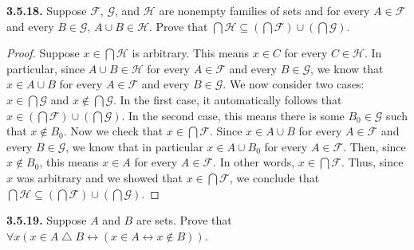 \documentclass[12pt]{amsart}
\newenvironment{statement}[1]{\smallskip\noindent\color[rgb]{.6627, .3529, .6314} {\bf #1.}}{}
\theoremstyle{definition}
\theoremstyle{remark}
\begin{document}
\begin{statement}{3.5.18}
Suppose $\mathcal{F}$, $\mathcal{G}$, and $\mathcal{H}$ are nonempty families of sets and for every $A \in \mathcal{F}$ and every $B \in \mathcal{G}$, $A \cup B \in \mathcal{H}$.
Prove that $\bigcap \mathcal{H} \subseteq \left( \bigcap \mathcal{F} \right) \cup \left( \bigcap \mathcal{G} \right)$.
\end{statement}

\begin{proof}
Suppose $x \in \bigcap \mathcal{H}$ is arbitrary.
This means $x \in C$ for every $C \in \mathcal{H}$.
In particular, since $A \cup B \in \mathcal{H}$ for every $A \in \mathcal{F}$ and every $B \in \mathcal{G}$, we know that $x \in A \cup B$ for every $A \in \mathcal{F}$ and every $B \in \mathcal{G}$.
We now consider two cases: $x \in \bigcap \mathcal{G}$ and $x \notin \bigcap \mathcal{G}$.
In the first case, it automatically follows that $x \in \left( \bigcap \mathcal{F} \right) \cup \left( \bigcap \mathcal{G} \right)$.
In the second case, this means there is some $B_0 \in \mathcal{G}$ such that $x \notin B_0$.
Now we check that $x \in \bigcap \mathcal{F}$.
Since $x \in A \cup B$ for every $A \in \mathcal{F}$ and every $B \in \mathcal{G}$, we know that in particular $x \in A \cup B_0$ for every $A \in \mathcal{F}$.
Then, since $x \notin B_0$, this means $x \in A$ for every $A \in \mathcal{F}$.
In other words, $x \in \bigcap \mathcal{F}$.
Thus, since $x$ was arbitrary and we showed that $x \in \bigcap \mathcal{F}$, we conclude that $\bigcap \mathcal{H} \subseteq \left( \bigcap \mathcal{F} \right) \cup \left( \bigcap \mathcal{G} \right)$.
\end{proof}


\begin{statement}{3.5.19}
Suppose $A$ and $B$ are sets.
Prove that $\forall x (x \in A \bigtriangleup B \leftrightarrow (x \in A \leftrightarrow x \notin B))$.
\end{statement}
\end{document}
